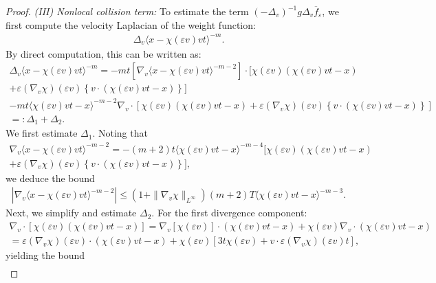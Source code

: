 \documentclass[reqno,11pt,final]{amsart}
\theoremstyle{plain}
\numberwithin{equation}{section}
\numberwithin{theorem}{section}
\begin{document}
\begin{proof}
\noindent \textit{(III) Nonlocal collision term:} To estimate the term $(-\Delta_v)^{-1}g\Delta_v\overline{f}_\varepsilon$, we first compute the velocity Laplacian of the weight function:
\begin{align*}
\Delta_v\langle x-\chi(\varepsilon v)vt\rangle^{-m}.
\end{align*}By direct computation, this can be written as:
\begin{multline*}
\Delta_v\langle x-\chi(\varepsilon v)vt\rangle^{-m} 
= -mt\left[\nabla_v\langle x-\chi(\varepsilon v)vt\rangle^{-m-2}\right]\cdot [\chi(\varepsilon v)(\chi(\varepsilon v)vt - x) \\
+\varepsilon(\nabla_v\chi)(\varepsilon v) \left\{v\cdot(\chi(\varepsilon v)vt -x)\right\} ] \\
- mt \langle \chi(\varepsilon v)vt - x\rangle^{-m-2}\nabla_v\cdot\left[\chi(\varepsilon v)(\chi(\varepsilon v)vt - x) + \varepsilon(\nabla_v\chi)(\varepsilon v) \left\{v\cdot(\chi(\varepsilon v)vt -x)\right\}\right]\\
=: \Delta_1 + \Delta_2.
\end{multline*}We first estimate $\Delta_1$. Noting that
\begin{multline*}
\nabla_v\langle x-\chi(\varepsilon v)vt\rangle^{-m-2} = -(m+2)t \langle \chi(\varepsilon v) vt - x\rangle^{-m-4}[\chi(\varepsilon v)(\chi(\varepsilon v)vt - x) \\
+ \varepsilon(\nabla_v\chi)(\varepsilon v)\left\{v\cdot(\chi(\varepsilon v)vt - x)\right\}],
\end{multline*}we deduce the bound
\begin{align}\label{Delta 1}
|\nabla_v\langle x-\chi(\varepsilon v)vt\rangle^{-m-2}| \le (1+\|\nabla_v\chi\|_{L^\infty})(m+2)T\langle \chi(\varepsilon v)vt - x\rangle^{-m-3}.
\end{align}Next, we simplify and estimate $\Delta_2$. For the first divergence component:
\begin{multline*}
\nabla_v\cdot\left[\chi(\varepsilon v)(\chi(\varepsilon v)vt - x)\right]
=\nabla_v\left[\chi(\varepsilon v)\right]\cdot(\chi(\varepsilon v)vt - x) + \chi(\varepsilon v)\nabla_v\cdot(\chi(\varepsilon v) vt - x)\\
= \varepsilon(\nabla_v\chi)(\varepsilon v)\cdot (\chi(\varepsilon v)vt - x) + \chi(\varepsilon v)\left[3t\chi(\varepsilon v) + v\cdot\varepsilon (\nabla_v\chi)(\varepsilon v)t\right],
\end{multline*}yielding the bound
\begin{align}\label{Delta 2-1}

\end{align}
\end{proof}
\end{document}
